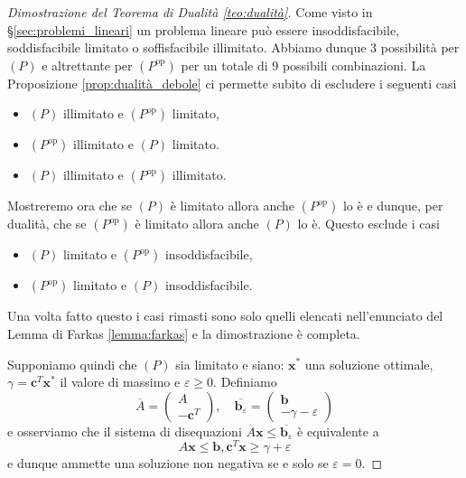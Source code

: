 \documentclass[italian, 12pt, reqno]{article}
\theoremstyle{myteo}
\numberwithin{equation}{section}
\newcommand{\dual}[1]{#1^{\text{op}}}
\begin{document}
\begin{proof}[Dimostrazione del Teorema di Dualità \ref{teo:dualità}]
  Come visto in \S\ref{sec:problemi_lineari} un problema lineare può essere insoddisfacibile, soddisfacibile limitato o soffisfacibile illimitato.
  Abbiamo dunque 3 possibilità per \((P)\) e altrettante per \((\dual{P})\) per un totale di 9 possibili combinazioni.
  La Proposizione \ref{prop:dualità_debole} ci permette subito di escludere i seguenti casi
  \begin{itemize}
  \item \((P)\) illimitato e \((\dual{P})\) limitato,
  \item \((\dual{P})\) illimitato e \((P)\) limitato.
  \item \((P)\) illimitato e \((\dual{P})\) illimitato.
  \end{itemize}
  Mostreremo ora che se \((P)\) è limitato allora anche \((\dual{P})\) lo è e dunque, per dualità, che se \((\dual{P})\) è limitato allora anche \((P)\) lo è.
  Questo esclude i casi
  \begin{itemize}
  \item \((P)\) limitato e \((\dual{P})\) insoddisfacibile,
  \item \((\dual{P})\) limitato e \((P)\) insoddisfacibile.
  \end{itemize}
  Una volta fatto questo i casi rimasti sono solo quelli elencati nell'enunciato del Lemma di Farkas \ref{lemma:farkas} e la dimostrazione è completa.

  Supponiamo quindi che \((P)\) sia limitato e siano: \(\textbf{x}^*\) una soluzione ottimale, \(\gamma = \textbf{c}^T \textbf{x}^*\) il valore di massimo e \(\varepsilon \geq 0\).
  Definiamo
  \[\overline{A} =
    \begin{pmatrix}
      A\\
      -\textbf{c}^T
    \end{pmatrix},\quad \overline{\textbf{b}_\varepsilon} =
    \begin{pmatrix}
      \mathbf{b}\\
      -\gamma-\varepsilon
    \end{pmatrix}\]
  e osserviamo che il sistema di disequazioni \(\overline{A}\textbf{x} \leq \overline{\textbf{b}_\varepsilon}\) è equivalente a
  \[A \textbf{x} \leq \textbf{b}, \textbf{c}^T \textbf{x} \geq \gamma + \varepsilon\]
  e dunque ammette una soluzione non negativa se e solo se \(\varepsilon = 0\).


\end{proof}
\end{document}
